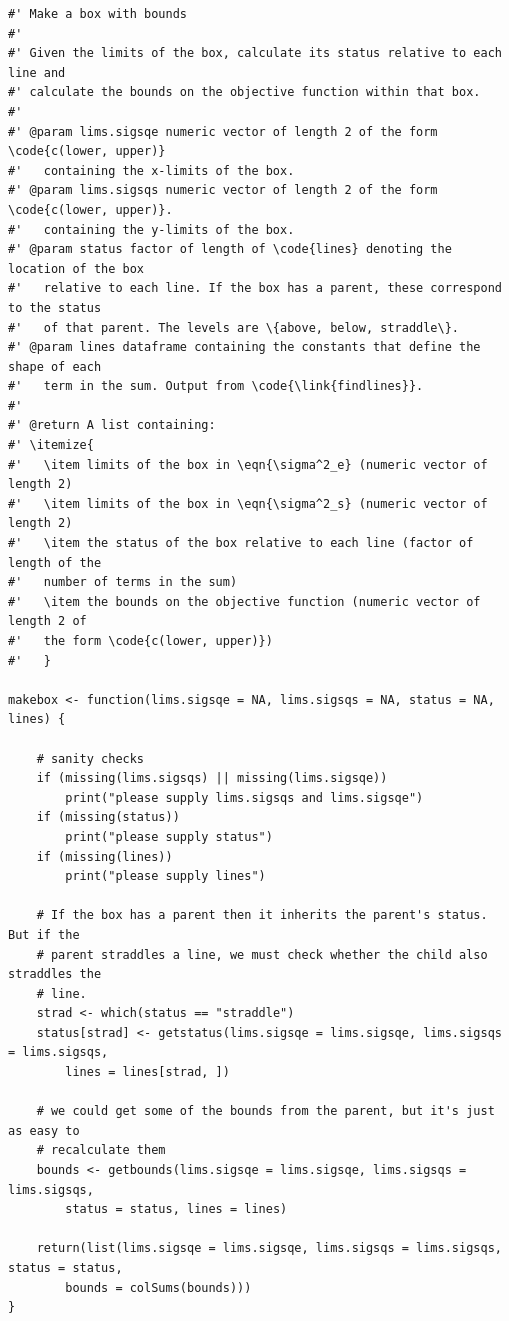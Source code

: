 \documentclass[ejs]{imsart}
\begin{document}
\begin{verbatim}
#' Make a box with bounds
#'
#' Given the limits of the box, calculate its status relative to each line and
#' calculate the bounds on the objective function within that box.
#'
#' @param lims.sigsqe numeric vector of length 2 of the form \code{c(lower, upper)}
#'   containing the x-limits of the box.
#' @param lims.sigsqs numeric vector of length 2 of the form \code{c(lower, upper)}.
#'   containing the y-limits of the box.
#' @param status factor of length of \code{lines} denoting the location of the box
#'   relative to each line. If the box has a parent, these correspond to the status
#'   of that parent. The levels are \{above, below, straddle\}.
#' @param lines dataframe containing the constants that define the shape of each
#'   term in the sum. Output from \code{\link{findlines}}.
#'
#' @return A list containing:
#' \itemize{
#'   \item limits of the box in \eqn{\sigma^2_e} (numeric vector of length 2)
#'   \item limits of the box in \eqn{\sigma^2_s} (numeric vector of length 2)
#'   \item the status of the box relative to each line (factor of length of the
#'   number of terms in the sum)
#'   \item the bounds on the objective function (numeric vector of length 2 of
#'   the form \code{c(lower, upper)})
#'   }

makebox <- function(lims.sigsqe = NA, lims.sigsqs = NA, status = NA, lines) {

    # sanity checks
    if (missing(lims.sigsqs) || missing(lims.sigsqe))
        print("please supply lims.sigsqs and lims.sigsqe")
    if (missing(status))
        print("please supply status")
    if (missing(lines))
        print("please supply lines")

    # If the box has a parent then it inherits the parent's status.  But if the
    # parent straddles a line, we must check whether the child also straddles the
    # line.
    strad <- which(status == "straddle")
    status[strad] <- getstatus(lims.sigsqe = lims.sigsqe, lims.sigsqs = lims.sigsqs,
        lines = lines[strad, ])

    # we could get some of the bounds from the parent, but it's just as easy to
    # recalculate them
    bounds <- getbounds(lims.sigsqe = lims.sigsqe, lims.sigsqs = lims.sigsqs,
        status = status, lines = lines)

    return(list(lims.sigsqe = lims.sigsqe, lims.sigsqs = lims.sigsqs, status = status,
        bounds = colSums(bounds)))
}
\end{verbatim}
\end{document}
